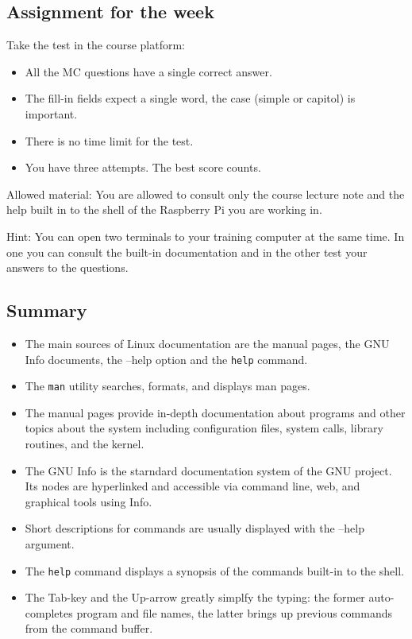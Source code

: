 \documentclass[11pt,a4paper,twoside]{article}
\begin{document}
\subsection{Assignment for the week}
Take the test in the course platform:
\begin{itemize}
\item All the MC questions have a single correct answer.
\item The fill-in fields expect a single word, the case (simple or capitol) 
is important.
\item There is no time limit for the test.
\item You have three attempts. The best score counts.
\end{itemize}

Allowed material: You are allowed to consult only the course lecture note 
and the help built in to the shell of the Raspberry Pi you are working in.

Hint: You can open two terminals to your training computer at the same time. In 
one you can consult the built-in documentation and in the other test your 
answers to the questions.

\subsection*{Summary}
\begin{itemize}
\item The main sources of Linux documentation are the manual pages, the GNU 
Info documents, the --help option and the \texttt{help} command.

\item The \texttt{man} utility searches, formats, and displays man pages.

\item The manual pages provide in-depth documentation about programs and 
other topics about the system including configuration files, system calls, 
library routines, and the kernel.

\item The GNU Info is the starndard documentation system of the GNU project. 
Its nodes are hyperlinked and accessible via command line, web, and graphical 
tools using Info.

\item Short descriptions for commands are usually displayed with the 
--help argument.

\item The \texttt{help} command displays a synopsis of the commands
built-in to the shell.

\item The Tab-key and the Up-arrow greatly simplfy the typing: the former
auto-completes program and file names, the latter brings up previous commands
from the command buffer.

\end{itemize}
\end{document}
